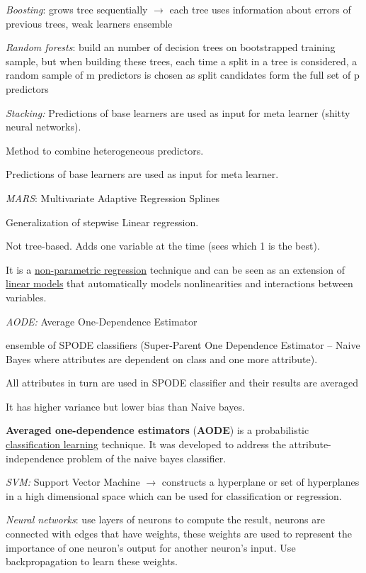 \textit{Boosting}: grows tree sequentially $\rightarrow$ each tree
uses information about errors of previous trees, weak learners ensemble

\textit{Random forests}: build an number of decision trees on
bootstrapped training sample, but when building these trees, each time a
split in a tree is considered, a random sample of m predictors is chosen
as split candidates form the full set of p
predictors

\textit{Stacking:} Predictions of base learners are used as input for
meta learner (shitty neural networks).

Method to combine heterogeneous predictors.

Predictions of base learners are used as input for meta learner.

\textit{MARS}: Multivariate Adaptive Regression Splines

Generalization of stepwise Linear regression.

Not tree-based. Adds one variable at the time (sees which 1 is the
best).

It is a
\href{https://en.wikipedia.org/wiki/Non-parametric_regression}{non-parametric
regression} technique and can be seen as an extension of
\href{https://en.wikipedia.org/wiki/Linear_model}{linear models} that
automatically models nonlinearities and interactions between variables.

\textit{AODE:} Average One-Dependence Estimator

ensemble of SPODE classifiers (Super-Parent One Dependence Estimator --
Naive Bayes where attributes are dependent on class and one more
attribute).

All attributes in turn are used in SPODE classifier and their results
are averaged

It has higher variance but lower bias than Naive bayes.

\textbf{Averaged one-dependence estimators} (\textbf{AODE}) is a
probabilistic
\href{https://en.wikipedia.org/wiki/Classifier_(mathematics)}{classification
learning} technique. It was developed to address the
attribute-independence problem of the naive bayes classifier.

\textit{SVM:} Support Vector Machine $\rightarrow$ constructs a
hyperplane or set of hyperplanes in a high dimensional space which can
be used for classification or regression.

\textit{Neural networks}: use layers of neurons to compute the
result, neurons are connected with edges that have weights, these
weights are used to represent the importance of one neuron's output for
another neuron's input. Use backpropagation to learn these weights.

